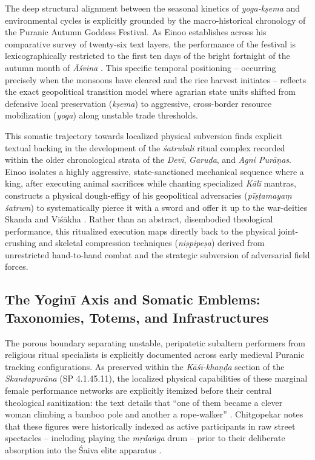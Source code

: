 \documentclass[11pt,twoside,letterpaper]{article}
\begin{document}
The deep structural alignment between the seasonal kinetics of \textit{yoga-kṣema} and environmental cycles is explicitly grounded by the macro-historical chronology of the Puranic Autumn Goddess Festival. As Einoo establishes across his comparative survey of twenty-six text layers, the performance of the festival is lexicographically restricted to the first ten days of the bright fortnight of the autumn month of \textit{Āśvina} \citep{Einoo1999}. This specific temporal positioning -- occurring precisely when the monsoons have cleared and the rice harvest initiates -- reflects the exact geopolitical transition model where agrarian state units shifted from defensive local preservation (\textit{kṣema}) to aggressive, cross-border resource mobilization (\textit{yoga}) along unstable trade thresholds.

This somatic trajectory towards localized physical subversion finds explicit textual backing in the development of the \textit{śatrubali} ritual complex recorded within the older chronological strata of the \textit{Devī}, \textit{Garuḍa}, and \textit{Agni Purāṇas}. Einoo isolates a highly aggressive, state-sanctioned mechanical sequence where a king, after executing animal sacrifices while chanting specialized \textit{Kālī} mantras, constructs a physical dough-effigy of his geopolitical adversaries (\textit{pīṣṭamayaṃ śatrum}) to systematically pierce it with a sword and offer it up to the war-deities Skanda and Viśākha \citep{Einoo1999}. Rather than an abstract, disembodied theological performance, this ritualized execution maps directly back to the physical joint-crushing and skeletal compression techniques (\textit{niṣpipeṣa}) derived from unrestricted hand-to-hand combat and the strategic subversion of adversarial field forces.

\subsection{The Yoginī Axis and Somatic Emblems: Taxonomies, Totems, and Infrastructures}
The porous boundary separating unstable, peripatetic subaltern performers from religious ritual specialists is explicitly documented across early medieval Puranic tracking configurations. As preserved within the \textit{Kāśī-khaṇḍa} section of the \textit{Skandapurāna} (SP 4.1.45.11), the localized physical capabilities of these marginal female performance networks are explicitly itemized before their central theological sanitization: the text details that “one of them became a clever woman climbing a bamboo pole and another a rope-walker” \citep{Shastri1991}. Chitgopekar notes that these figures were historically indexed as active participants in raw street spectacles -- including playing the \textit{ mṛdaṅga} drum -- prior to their deliberate absorption into the Śaiva elite apparatus \citep{Chitgopekar2002}.
\end{document}
